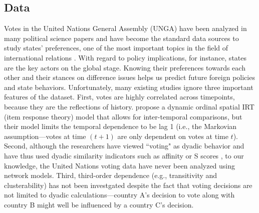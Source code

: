 \documentclass[a4paper]{article}
\begin{document}
\subsection{Data}\label{subsec: data processing}
Votes in the United Nations General Assembly (UNGA) have been analyzed in many political science papers \citep{voeten2000clashes,voeten2004resisting,bearce2007intergovernmental,mattes2015leadership,bailey2017estimating} and have become the standard data sources to study states' preferences, one of the most important topics in the field of international relations \citep{wendt_1994}. With regard to policy implications, for instance, states are the key actors on the global stage. Knowing their preferences towards each other and their stances on difference issues helps us predict future foreign policies and state behaviors. Unfortunately, many existing studies ignore three important features of the dataset. First, votes are highly correlated across timepoints, because they are the reflections of history. \cite{bailey2017estimating} propose a dynamic ordinal spatial IRT (item response theory) model that allows for inter-temporal comparisons, but their model limits the temporal dependence to be lag 1 (i.e., the Markovian assumption---votes at time $(t+1)$ are only dependent on votes at time $t$). Second, although the researchers have viewed ``voting" as dyadic behavior and have thus used dyadic similarity indicators such as affinity or S scores \citep{gartzke1998kant,signorino1999tau}, to our knowledge, the United Nations voting data have never been analyzed using network models. Third, third-order dependence (e.g., transitivity and clusterability) has not been investgated despite the fact that voting decisions are not limited to dyadic calculations---country A's decision to vote along with country B might well be influenced by a country C's decision.\\ \newline
\end{document}

